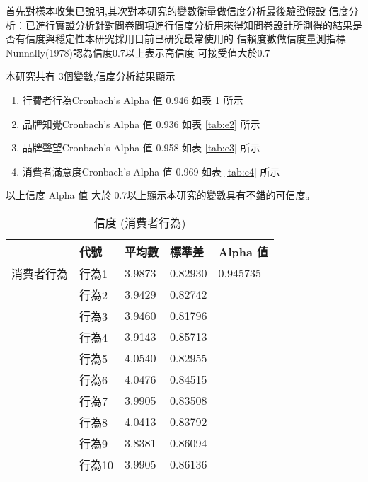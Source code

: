 首先對樣本收集已說明,其次對本研究的變數衡量做信度分析最後驗證假設
信度分析：已進行實證分析針對問卷問項進行信度分析用來得知問卷設計所測得的結果是否有信度與穩定性本研究採用目前已研究最常使用的 信賴度數做信度量測指標 Nunnally(1978)認為信度0.7以上表示高信度 可接受值大於0.7

本研究共有 3個變數,信度分析結果顯示
\begin{enumerate}
\item 行費者行為Cronbach's Alpha 值 0.946  如表 \ref{tab:e1}  所示
\item 品牌知覺Cronbach's Alpha 值 0.936  如表 \ref{tab:e2}  所示
\item 品牌聲望Cronbach's Alpha 值  0.958 如表 \ref{tab:e3}  所示
\item 消費者滿意度Cronbach's Alpha 值 0.969 如表 \ref{tab:e4}  所示
\end{enumerate}
以上信度 Alpha 值 大於 0.7以上顯示本研究的變數具有不錯的可信度。

\begin{table}[htb]
\caption{信度 (消費者行為)}
\label{tab:e1}
\renewcommand{\arraystretch}{1.2} %
\arrayrulewidth=1pt               %
\tabcolsep=18pt                   %
\begin{tabular}[t]{lllll}  %
\hline
  & 代號& 平均數 & 標準差&  Alpha 值  \\
\hline
消費者行為&行為1&3.9873&0.82930&0.945735\\
               &行為2&3.9429	&0.82742&\\	
               &行為3&3.9460&0.81796&\\
               &行為4&3.9143&0.85713&\\
               &行為5&4.0540&0.82955&\\
               &行為6&4.0476&0.84515&\\
               &行為7&3.9905&0.83508&\\
               &行為8&4.0413&0.83792&\\
               &行為9&3.8381&0.86094&\\
               &行為10&3.9905&0.86136&\\
\hline
\end{tabular}
\end{table}

